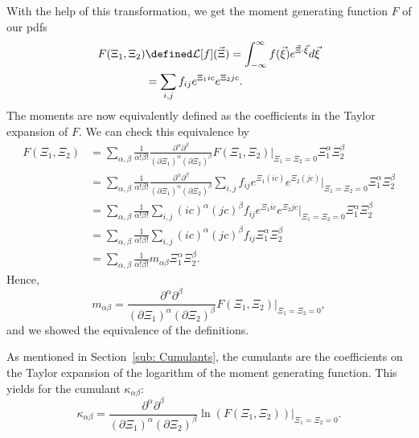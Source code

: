 With the help of this transformation, we get the moment generating function $F$ of our \glspl{pdf}
\begin{equation}
  \label{eq:Definition of F}
  \begin{aligned}
    F(\Xi_1, \Xi_2) & \defined \mathcal{L}[f](\vec{\Xi}) = \int_{-\infty}^\infty f(\vec{\xi}) e^{\vec{\Xi} \cdot \vec{\xi}}d\vec{\xi} \\
     & = \sum_{i,j}f_{ij} e^{\Xi_1 ic} e^{\Xi_2 jc}.
  \end{aligned}
\end{equation}
The moments are now equivalently defined as the coefficients in the Taylor expansion of $F$.
We can check this equivalence by
\begin{equation}
  \label{eq: taylor of F}
  \begin{aligned}
    F(\Xi_1, \Xi_2) & = \sum_{\alpha,\beta} \frac{1}{\alpha!\beta!} \frac{\partial^\alpha\partial^\beta}{{(\partial \Xi_1)}^\alpha{(\partial \Xi_2)}^\beta} F(\Xi_1, \Xi_2)\Bigr|_{\Xi_1=\Xi_2 = 0} \Xi_1^\alpha \Xi_2^\beta \\
    & = \sum_{\alpha,\beta} \frac{1}{\alpha!\beta!} \frac{\partial^\alpha\partial^\beta}
      {{(\partial \Xi_1)}^\alpha{(\partial \Xi_2)}^\beta}  \sum_{i,j} f_{ij} e^{\Xi_1 (ic)} e^{\Xi_2 (jc)} \Bigr|_{\Xi_1=\Xi_2 = 0} \Xi_1^\alpha \Xi_2^\beta \\
    & = \sum_{\alpha,\beta} \frac{1}{\alpha!\beta!}
    \sum_{i,j}  {(ic)}^\alpha {(jc)}^\beta f_{ij} e^{\Xi_1 ic} e^{\Xi_2 jc} \Bigr|_{\Xi_1=\Xi_2 = 0} \Xi_1^\alpha \Xi_2^\beta \\
    & = \sum_{\alpha,\beta} \frac{1}{\alpha!\beta!}
    \sum_{i,j} {(ic)}^\alpha {(jc)}^\beta f_{ij} \Xi_1^\alpha \Xi_2^\beta \\
    & = \sum_{\alpha,\beta} \frac{1}{\alpha!\beta!} m_{\alpha\beta} \Xi_1^\alpha \Xi_2^\beta.
  \end{aligned}
\end{equation}
Hence,
\begin{equation}
  \label{eq: alternative representation of moments}
  m_{\alpha\beta} = \frac{\partial^\alpha\partial^\beta}{{(\partial \Xi_1)}^\alpha{(\partial \Xi_2)}^\beta} F(\Xi_1, \Xi_2)\Bigr|_{\Xi_1=\Xi_2 = 0},
\end{equation}
and we showed the equivalence of the definitions.

As mentioned in Section~\ref{sub: Cumulants}, the cumulants are the coefficients on the Taylor expansion of the logarithm of the moment generating function.
This yields for the cumulant $\kappa_{\alpha\beta}$:
\begin{equation}
  \label{eq: definition of cumulants}
  \kappa_{\alpha\beta} = \frac{\partial^\alpha\partial^\beta}{{(\partial \Xi_1)}^\alpha{(\partial \Xi_2)}^\beta} \ln(F(\Xi_1, \Xi_2))\Bigr|_{\Xi_1=\Xi_2 = 0}.
\end{equation}
